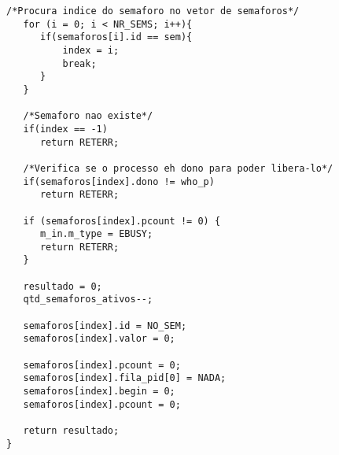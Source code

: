 \documentclass[brazil, a4paper]{scrartcl}
\begin{document}
\begin{lstlisting}[style=customc]
   /*Procura indice do semaforo no vetor de semaforos*/
   for (i = 0; i < NR_SEMS; i++){
      if(semaforos[i].id == sem){
          index = i;
          break;
      }
   }

   /*Semaforo nao existe*/
   if(index == -1)
      return RETERR;    
   
   /*Verifica se o processo eh dono para poder libera-lo*/ 
   if(semaforos[index].dono != who_p)
      return RETERR;
   
   if (semaforos[index].pcount != 0) {
      m_in.m_type = EBUSY;
      return RETERR;
   }

   resultado = 0; 
   qtd_semaforos_ativos--;
    
   semaforos[index].id = NO_SEM;
   semaforos[index].valor = 0;
    
   semaforos[index].pcount = 0;  
   semaforos[index].fila_pid[0] = NADA;  
   semaforos[index].begin = 0;
   semaforos[index].pcount = 0;
   
   return resultado;
}
\end{lstlisting}
\end{document}
